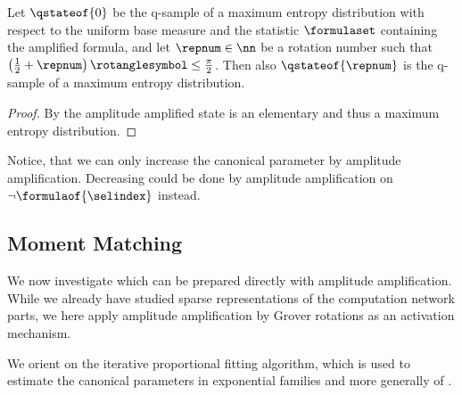 \begin{theorem}
    \label{the:rotationKeepsMaxEntropy}
    Let $\qstateof{0}$ be the q-sample of a maximum entropy distribution with respect to the uniform base measure and the statistic $\formulaset$ containing the amplified formula, and let $\repnum\in\nn$ be a rotation number such that $\left(\frac{1}{2}+\repnum\right)\rotanglesymbol\leq\frac{\pi}{2}$.
    Then also $\qstateof{\repnum}$ is the q-sample of a maximum entropy distribution.
\end{theorem}
\begin{proof}%
    By  the amplitude amplified state is an elementary \ComputationActivationNetwork{} and thus a maximum entropy distribution.
\end{proof}

%
Notice, that we can only increase the canonical parameter by amplitude amplification.
Decreasing could be done by amplitude amplification on $\lnot\formulaof{\selindex}$ instead.



\subsection{Moment Matching} %

We now investigate which \ComputationActivationNetworks{} can be prepared directly with amplitude amplification.
While we already have studied sparse representations of the computation network parts, we here apply amplitude amplification by Grover rotations as an activation mechanism.

We orient on the iterative proportional fitting algorithm, which is used to estimate the canonical parameters in exponential families  \cite{wainwright_graphical_2008} and more generally of \ComputationActivationNetworks{} \cite{goessmann_tensor-network_2025}.

